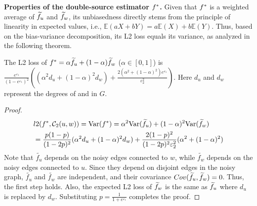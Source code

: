 \noindent
{\bf Properties of the double-source estimator $f^*$.} 
Given that $f^*$ is a weighted average of $\widetilde{f}_u$ and $\widetilde{f}_w$, its unbiasedness directly stems from the principle of linearity in expected values, i.e., $\mathbb{E}(aX + bY) = a\mathbb{E}(X) + b\mathbb{E}(Y)$. 
Thus, based on the bias-variance decomposition, its L2 loss equals its variance, as analyzed in the following theorem. 
\begin{theorem}
\label{thm:balance}
The L2 loss of $f^* = \alpha \widetilde{f}_u+ (1 - \alpha) \widetilde{f}_w$ ($\alpha \in [0,1]$) is $\frac{ e^{\varepsilon_1}}{(1 - e^{\varepsilon_1})^2} \left( (\alpha^2 d_u+(1-\alpha)^2d_w)  + \frac{ 2(\alpha^2 + (1-\alpha)^2)e^{\varepsilon_1}}{\varepsilon_2^2} \right)
$.
Here $d_u$ and $d_w$ represent the degrees of \vq and \vx in $G$. 
\end{theorem}
\begin{proof}

\begin{align*}
    & l2(f^*, \mathcal{C}_2(u,w))  = \text{Var}(f^*) = \alpha^2 \text{Var}(\widetilde{f}_u) + (1 - \alpha)^2 \text{Var}(\widetilde{f}_w) \notag \\
    & = \frac{p(1-p)}{(1-2p)^2} (\alpha^2 d_u + (1 - \alpha)^2 d_w) +
     \frac{2(1-p)^2}{(1-2p)^2\varepsilon_2^2}(\alpha^2 + (1 - \alpha)^2)
     \label{xxx}
\end{align*}  
{
Note that $\tilde{f_u}$ depends on the noisy edges connected to $w$, while $\tilde{f_w}$ depends on the noisy edges connected to $u$. Since they depend on disjoint edges in the noisy graph, $\tilde{f_u}$  and $\tilde{f_w}$ are independent, and their covariance $Cov(\widetilde{f}_u, \widetilde{f}_w)=0$. Thus, the first step holds. }
Also, the expected L2 loss of $\widetilde{f}_w$ is the same as $\widetilde{f}_u$ where $d_u$ is replaced by $d_w$. 
Substituting $p = \frac{1}{1+ e^{\varepsilon_1}}$ completes the proof. 
\end{proof}


